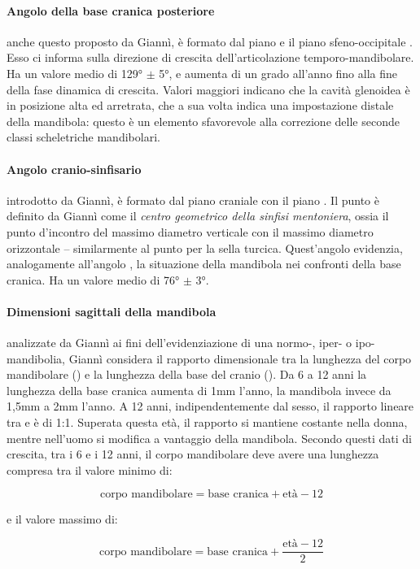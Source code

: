 \paragraph{Angolo della base cranica posteriore} anche questo proposto da Giannì, è formato dal piano  e il piano sfeno-occipitale . Esso ci informa sulla direzione di crescita dell'articolazione temporo-mandibolare\nocite{Ricketts1960}. Ha un valore medio di 129° $\pm$ 5°, e aumenta di un grado all'anno fino alla fine della fase dinamica di crescita. Valori maggiori indicano che la cavità glenoidea è in posizione alta ed arretrata, che a sua volta indica una impostazione distale della mandibola: questo è un elemento sfavorevole alla correzione delle seconde classi scheletriche mandibolari.

\paragraph{Angolo cranio-sinfisario} introdotto da Giannì, è formato dal piano craniale  con il piano . Il punto  è definito da Giannì come il \textit{centro geometrico della sinfisi mentoniera}, ossia il punto d'incontro del massimo diametro verticale con il massimo diametro orizzontale -- similarmente al punto  per la sella turcica. Quest'angolo evidenzia, analogamente all'angolo , la situazione della mandibola nei confronti della base cranica. Ha un valore medio di 76° $\pm$ 3°.

\paragraph{Dimensioni sagittali della mandibola} analizzate da Giannì ai fini dell'evidenziazione di una normo-, iper- o ipo-mandibolia, Giannì considera il rapporto dimensionale tra la lunghezza del corpo mandibolare () e la lunghezza della base del cranio (). Da 6 a 12 anni la lunghezza della base cranica aumenta di 1mm l'anno, la mandibola invece da 1,5mm a 2mm l'anno. A 12 anni, indipendentemente dal sesso, il rapporto lineare tra  e  è di 1:1. Superata questa età, il rapporto si mantiene costante nella donna, mentre nell'uomo si modifica a vantaggio della mandibola. Secondo questi dati di crescita, tra i 6 e i 12 anni, il corpo mandibolare deve avere una lunghezza compresa tra il valore minimo di:
\begin{singlespace}
\[ \text{corpo mandibolare} = \text{base cranica} + \text{età} - 12 \]
\end{singlespace}
e il valore massimo di:
\begin{singlespace}
\[ \text{corpo mandibolare} = \text{base cranica} + \frac{\text{età} - 12}{2} \]
\end{singlespace}

